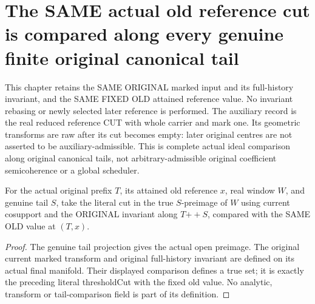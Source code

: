 \section{The SAME actual old reference cut is compared along every genuine finite original canonical tail}

This chapter retains the SAME ORIGINAL marked input and its full-history
invariant, and the SAME FIXED OLD attained reference value. No invariant
rebasing or newly selected later reference is performed. The auxiliary
record is the real reduced reference CUT with whole carrier and mark one.
Its geometric transforms are raw after its cut becomes empty: later
original centres are not asserted to be auxiliary-admissible. This is
complete actual ideal comparison along original canonical tails, not
arbitrary-admissible original coefficient semicoherence or a global scheduler.

\begin{definition}
\label{hir:original-canonical-tail-literal-fixed-old-reference-cut}
\leanok
{}
For the actual original prefix $T$, its attained old reference $x$, real
window $W$, and genuine tail $S$, take the literal cut in the true
$S$-preimage of $W$ using current cosupport and the ORIGINAL invariant
along $T\mathbin{+\!+}S$, compared with the SAME OLD value at $(T,x)$.
\end{definition}
\begin{proof}
The genuine tail projection gives the actual open preimage. The original
current marked transform and original full-history invariant are defined
on its actual final manifold. Their displayed comparison defines a true set;
it is exactly the preceding literal thresholdCut with the fixed old value.
No analytic, transform or tail-comparison field is part of its definition.
\end{proof}


